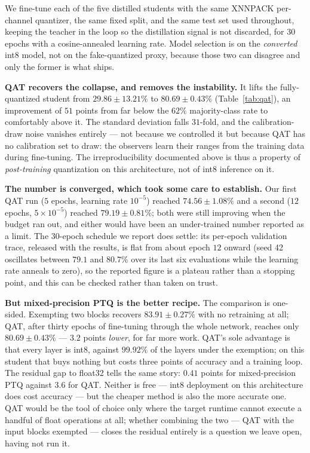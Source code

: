 \documentclass[conference]{IEEEtran}
\begin{document}
We fine-tune each of the five distilled students with the same XNNPACK
per-channel quantizer, the same fixed split, and the same test set used
throughout, keeping the teacher in the loop so the distillation signal is not
discarded, for $30$ epochs with a cosine-annealed learning rate. Model selection
is on the \emph{converted} int8 model, not on the fake-quantized proxy, because
those two can disagree and only the former is what ships.

\textbf{QAT recovers the collapse, and removes the instability.} It lifts the
fully-quantized student from $29.86\pm13.21\%$ to $80.69\pm0.43\%$
(Table~\ref{tab:qat}), an improvement of $51$ points from far below the $62\%$
majority-class rate to comfortably above it. The standard deviation falls
$31$-fold, and the calibration-draw noise vanishes entirely --- not because we
controlled it but because QAT has no calibration set to draw: the observers learn
their ranges from the training data during fine-tuning. The irreproducibility
documented above is thus a property of \emph{post-training} quantization on this
architecture, not of int8 inference on it.

\textbf{The number is converged, which took some care to establish.} Our first
QAT run ($5$ epochs, learning rate $10^{-5}$) reached $74.56\pm1.08\%$ and a second
($12$ epochs, $5\times10^{-5}$) reached $79.19\pm0.81\%$; both were still improving
when the budget ran out, and either would have been an under-trained number
reported as a limit. The $30$-epoch schedule we report does settle: its per-epoch
validation trace, released with the results, is flat from about epoch $12$
onward (seed 42 oscillates between $79.1$ and $80.7\%$ over its last six
evaluations while the learning rate anneals to zero), so the reported figure is a
plateau rather than a stopping point, and this can be checked rather than taken on
trust.

\textbf{But mixed-precision PTQ is the better recipe.} The comparison is
one-sided. Exempting two blocks recovers $83.91\pm0.27\%$ with no retraining at
all; QAT, after thirty epochs of fine-tuning through the whole network, reaches
only $80.69\pm0.43\%$ --- $3.2$ points \emph{lower}, for far more work. QAT's sole
advantage is that every layer is int8, against $99.92\%$ of the layers under the
exemption; on this student that buys nothing but costs three points of accuracy
and a training loop. The residual gap to float32 tells the same story: $0.41$
points for mixed-precision PTQ against $3.6$ for QAT. Neither is free --- int8
deployment on this architecture does cost accuracy --- but the cheaper method is
also the more accurate one. QAT would be the tool of choice only where the target
runtime cannot execute a handful of float operations at all; whether combining the
two --- QAT with the input blocks exempted --- closes the residual entirely is a
question we leave open, having not run it.
\end{document}
